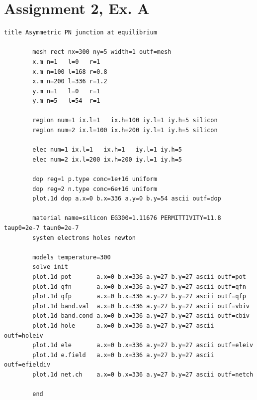 \documentclass{book}
\begin{document}
        \newpage
        \section*{Assignment 2, Ex. A}
        \begin{Verbatim}[gobble=4]
        title Asymmetric PN junction at equilibrium

        mesh rect nx=300 ny=5 width=1 outf=mesh
        x.m n=1   l=0   r=1
        x.m n=100 l=168 r=0.8
        x.m n=200 l=336 r=1.2
        y.m n=1   l=0   r=1
        y.m n=5   l=54  r=1

        region num=1 ix.l=1   ix.h=100 iy.l=1 iy.h=5 silicon
        region num=2 ix.l=100 ix.h=200 iy.l=1 iy.h=5 silicon

        elec num=1 ix.l=1   ix.h=1   iy.l=1 iy.h=5
        elec num=2 ix.l=200 ix.h=200 iy.l=1 iy.h=5

        dop reg=1 p.type conc=1e+16 uniform
        dop reg=2 n.type conc=6e+16 uniform
        plot.1d dop a.x=0 b.x=336 a.y=0 b.y=54 ascii outf=dop

        material name=silicon EG300=1.11676 PERMITTIVITY=11.8 taup0=2e-7 taun0=2e-7
        system electrons holes newton

        models temperature=300
        solve init
        plot.1d pot       a.x=0 b.x=336 a.y=27 b.y=27 ascii outf=pot
        plot.1d qfn       a.x=0 b.x=336 a.y=27 b.y=27 ascii outf=qfn
        plot.1d qfp       a.x=0 b.x=336 a.y=27 b.y=27 ascii outf=qfp
        plot.1d band.val  a.x=0 b.x=336 a.y=27 b.y=27 ascii outf=vbiv
        plot.1d band.cond a.x=0 b.x=336 a.y=27 b.y=27 ascii outf=cbiv
        plot.1d hole      a.x=0 b.x=336 a.y=27 b.y=27 ascii outf=holeiv
        plot.1d ele       a.x=0 b.x=336 a.y=27 b.y=27 ascii outf=eleiv
        plot.1d e.field   a.x=0 b.x=336 a.y=27 b.y=27 ascii outf=efieldiv
        plot.1d net.ch    a.x=0 b.x=336 a.y=27 b.y=27 ascii outf=netch

        end
        \end{Verbatim}


        \newpage
\end{document}
